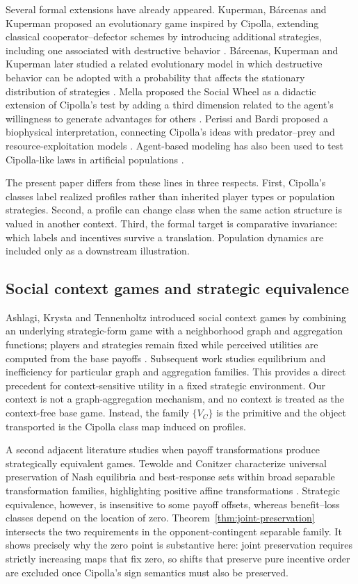 \documentclass[a4paper,fleqn]{cas-dc}
\theoremstyle{remark}
\begin{document}
Several formal extensions have already appeared. Kuperman, B\'{a}rcenas and Kuperman proposed an evolutionary game inspired by Cipolla, extending classical cooperator--defector schemes by introducing additional strategies, including one associated with destructive behavior \citep{Kuperman2020}. B\'{a}rcenas, Kuperman and Kuperman later studied a related evolutionary model in which destructive behavior can be adopted with a probability that affects the stationary distribution of strategies \citep{Barcenas2020}. Mella proposed the Social Wheel as a didactic extension of Cipolla's test by adding a third dimension related to the agent's willingness to generate advantages for others \citep{Mella2017}. Perissi and Bardi proposed a biophysical interpretation, connecting Cipolla's ideas with predator--prey and resource-exploitation models \citep{PerissiBardi2021}. Agent-based modeling has also been used to test Cipolla-like laws in artificial populations \citep{Tettamanzi2014}.

The present paper differs from these lines in three respects. First, Cipolla's
classes label realized profiles rather than inherited player types or population
strategies. Second, a profile can change class when the same action structure is
valued in another context. Third, the formal target is comparative invariance:
which labels and incentives survive a translation. Population dynamics are
included only as a downstream illustration.

\subsection{Social context games and strategic equivalence}

Ashlagi, Krysta and Tennenholtz introduced social context games by combining an
underlying strategic-form game with a neighborhood graph and aggregation
functions; players and strategies remain fixed while perceived utilities are
computed from the base payoffs \citep{AshlagiKrystaTennenholtz2008}. Subsequent
work studies equilibrium and inefficiency for particular graph and aggregation
families. This provides a direct precedent for context-sensitive utility in a
fixed strategic environment. Our context is not a graph-aggregation mechanism,
and no context is treated as the context-free base game. Instead, the family
$\{V_C\}$ is the primitive and the object transported is the Cipolla class map
induced on profiles.

A second adjacent literature studies when payoff transformations produce
strategically equivalent games. Tewolde and Conitzer characterize universal
preservation of Nash equilibria and best-response sets within broad separable
transformation families, highlighting positive affine transformations
\citep{TewoldeConitzer2024}. Strategic equivalence, however, is insensitive to
some payoff offsets, whereas benefit--loss classes depend on the location of
zero. Theorem~\ref{thm:joint-preservation} intersects the two requirements in
the opponent-contingent separable family. It shows precisely why the zero point
is substantive here: joint preservation requires strictly increasing maps that
fix zero, so shifts that preserve pure incentive order are excluded once
Cipolla's sign semantics must also be preserved.
\end{document}
